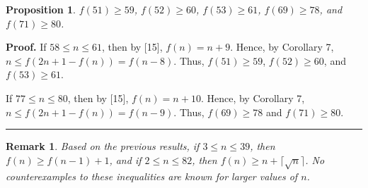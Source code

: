 \documentclass[12]{article}
\newtheorem{proposition}[theorem]{Proposition}
\newtheorem{remark}[theorem]{Remark}
\newenvironment{proof}[1][Proof]{\textbf{#1.} }{\ \rule{0.5em}{0.5em}}
\begin{document}
\begin{proposition}
$f(51)\ge 59$, $f(52)\ge 60$, $f(53)\ge 61$, $f(69)\ge 78$, and $f(71)\ge 80$.
\end{proposition}

\begin{proof}
If $58\le n\le 61$, then by [15], $f(n)=n+9$. Hence, by Corollary 7, $
n\le f(2n+1-f(n))=f(n-8)$. Thus, $f(51)\ge 59$, $f(52)\ge 60$, and $f(53)\ge 61$.

If $77\le n\le 80$, then by [15], $f(n)=n+10$. Hence, by Corollary 7,
$n\le f(2n+1-f(n))=f(n-9)$. Thus, $f(69)\ge 78$ and $f(71)\ge 80$.
\end{proof}

\begin{remark}
{\em Based on the previous results, if $3\le n\le 39$, then $f(n)\ge f(n-1)+1$, and if $2\le n\le 82$, then $f(n)\ge n+\lceil\sqrt{n}\rceil$. No counterexamples to these inequalities are known for larger values of $n$.}
\end{remark}
\end{document}
